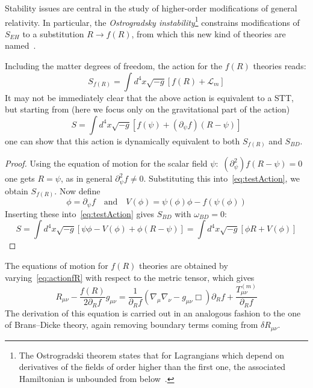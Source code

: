 Stability issues are central in the study of higher-order modifications of general relativity. 
In particular, the \textit{Ostrogradsky instability}\footnote{The Ostrogradski theorem states that for Lagrangians which depend on derivatives of the fields of order higher than the first one, the associated Hamiltonian is unbounded from below~\cite{Quiros:2019ktw}.}
constrains modifications of $S_{EH}$ to a substitution $R \rightarrow f (R)$, from which this new kind of theories are named~\cite{Quiros:2019ktw}.

Including the matter degrees of freedom, the action for the $f (R)$ theories reads:
\begin{equation}\label{eq:actionfR}
    S_{f(R)} = \int d^4 x \sqrt{-g} \left[f (R)+ \mathcal{L}_m \right]
\end{equation}
\noindent
It may not be immediately clear that the above action is equivalent to a STT, but starting from (here we focus only on the gravitational part of the action)
\begin{equation}\label{eq:testAction}
    S=\int d^4x \sqrt{-g} \left[f (\psi)+ (\partial_\psi f) (R-\psi)\right]
\end{equation}
one can show that this action is dynamically equivalent to both $S_{f(R)}$ and $S_{BD}$.
\begin{proof}
Using the equation of motion for the scalar field $\psi$: $\,(\partial^2_{\psi})f(R-\psi)=0$ one gets $R=\psi$, as in general $\partial^2_{\psi}f\neq 0$. Substituting this into~\eqref{eq:testAction}, we obtain $S_{f(R)}$.
\noindent
Now define
\begin{equation*}
    \phi= \partial_\psi f \quad \text{and} \quad V(\phi) = \psi(\phi)\phi -f(\psi(\phi))
\end{equation*}
Inserting these into~\eqref{eq:testAction} gives $S_{BD}$ with $\omega_{BD}=0$:
\begin{equation*}
    S= \int d^4x \sqrt{-g} \left[\psi\phi - V(\phi) + \phi(R-\psi) \right] = \int d^4x \sqrt{-g} \left[ \phi R + V(\phi) \right]
\end{equation*}
\end{proof}

The equations of motion for $f(R)$ theories are obtained by varying~\eqref{eq:actionfR} with respect to the metric tensor, which gives
\begin{equation}\label{eq:EinsteinEqfR}
    R_{\mu\nu} - \frac{f(R)}{2 \partial_R f}g_{\mu\nu} = \frac{1}{\partial_R f}\left( \nabla_\mu \nabla_\nu - g_{\mu\nu} \Box  \right)\partial_R f + \frac{T_{\mu\nu}^{(m)}}{\partial_R f}
\end{equation}
The derivation of this equation is carried out in an analogous fashion to the one of Brans–Dicke theory, again removing boundary terms coming from $\delta R_{\mu\nu}$.
